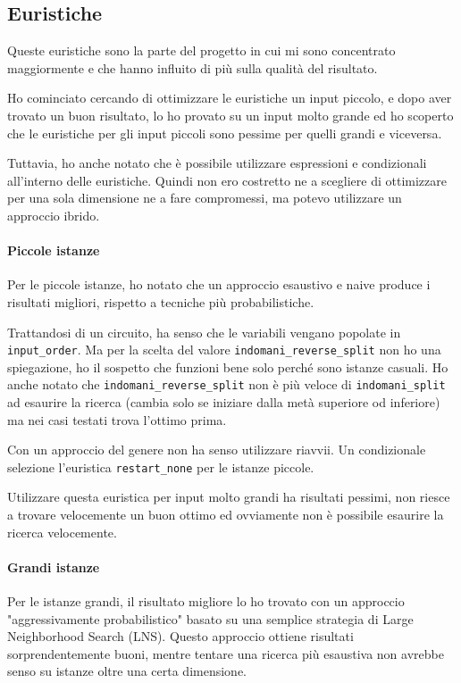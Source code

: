 \documentclass[12pt, a4paper]{article}
\begin{document}
\subsection{Euristiche}

Queste euristiche sono la parte del progetto in cui mi sono concentrato maggiormente e che hanno influito di più sulla qualità del risultato.

Ho cominciato cercando di ottimizzare le euristiche un input piccolo, e dopo aver trovato un buon risultato, lo ho provato su un input molto grande ed ho scoperto che le euristiche per gli input piccoli sono pessime per quelli grandi e viceversa.

Tuttavia, ho anche notato che è possibile utilizzare espressioni e condizionali all'interno delle euristiche. Quindi non ero costretto ne a scegliere di ottimizzare per una sola dimensione ne a fare compromessi, ma potevo utilizzare un approccio ibrido.

\paragraph{Piccole istanze}
Per le piccole istanze, ho notato che un approccio esaustivo e naive produce i risultati migliori, rispetto a tecniche più probabilistiche.

Trattandosi di un circuito, ha senso che le variabili vengano popolate in \lstinline{input_order}. Ma per la scelta del valore \lstinline{indomani_reverse_split} non ho una spiegazione, ho il sospetto che funzioni bene solo perché sono istanze casuali.
Ho anche notato che \lstinline{indomani_reverse_split} non è più veloce di \lstinline{indomani_split} ad esaurire la ricerca (cambia solo se iniziare dalla metà superiore od inferiore) ma nei casi testati trova l'ottimo prima.

Con un approccio del genere non ha senso utilizzare riavvii. Un condizionale selezione l'euristica \lstinline{restart_none} per le istanze piccole.

Utilizzare questa euristica per input molto grandi ha risultati pessimi, non riesce a trovare velocemente un buon ottimo ed ovviamente non è possibile esaurire la ricerca velocemente.

\paragraph{Grandi istanze}
Per le istanze grandi, il risultato migliore lo ho trovato con un approccio "aggressivamente probabilistico" basato su una semplice strategia di Large Neighborhood Search (LNS).
Questo approccio ottiene risultati sorprendentemente buoni, mentre tentare una ricerca più esaustiva non avrebbe senso su istanze oltre una certa dimensione.
\end{document}
